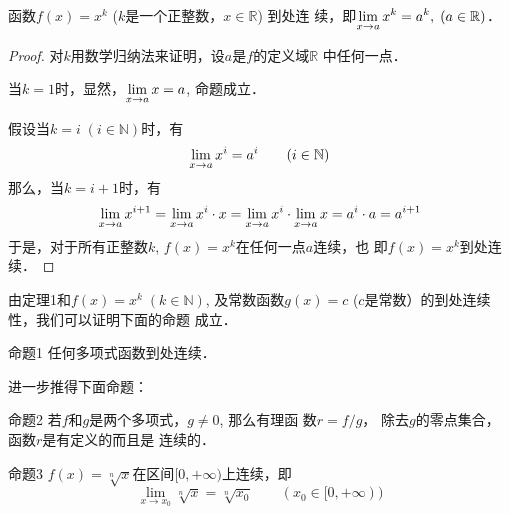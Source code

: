 \begin{example}
    函数$f(x)=x^k$ ($k$是一个正整数，$x\in\mathbb{R}$) 到处连
续，即$\displaystyle\lim_{x\to a}x^k=a^k,\; (a\in\mathbb{R})$．
\end{example}

\begin{proof}
对$k$用数学归纳法来证明，设$a$是$f$的定义域$\mathbb{R}$
中任何一点．

当$k=1$时，显然，$\displaystyle\lim_{x\to a}x=a$, 命题成立．

假设当$k=i\; (i\in\mathbb{N})$时，有
\[\displaystyle\lim_{x\to a} x^i=a^i\qquad (i\in\mathbb{N})\]
那么，当$k=i+1$时，有
\[\displaystyle\lim_{x\to a}x^{i+1}=\displaystyle\lim_{x\to a} x^i\cdot x=\displaystyle\lim_{x\to a} x^i\cdot \displaystyle\lim_{x\to a} x=a^i\cdot a=a^{i+1}\]    
于是，对于所有正整数$k$, $f(x)=x^k$在任何一点$a$连续，也
即$f(x)=x^k$到处连续．
\end{proof}


由定理1和$f(x)=x^k\; (k\in\mathbb{N})$, 及常数函数$g(x)=c$ ($c$是常数）的到处连续性，我们可以证明下面的命题
成立．

\begin{blk}{命题1}
    任何多项式函数到处连续．
\end{blk}

进一步推得下面命题：

\begin{blk}{命题2}
    若$f$和$g$是两个多项式，$g\ne 0$, 那么有理函
数$r=f/g$，
除去$g$的零点集合，函数$r$是有定义的而且是
连续的．
\end{blk}

\begin{blk}{命题3}
    $f(x)=\sqrt[n]{x}$在区间$[0,+\infty)$上连续，即
\[\lim_{x\to x_0}\sqrt[n]{x}=\sqrt[n]{x_0}\qquad (x_0\in[0,+\infty))\]
\end{blk}

